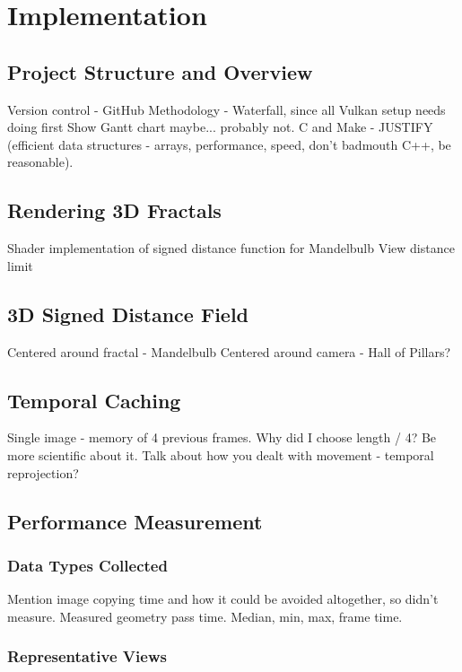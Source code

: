 \chapter{Implementation}
\label{chapter3}

\section{Project Structure and Overview}

Version control - GitHub
Methodology - Waterfall, since all Vulkan setup needs doing first
Show Gantt chart maybe... probably not.
C and Make - JUSTIFY (efficient data structures - arrays, performance, speed, don't badmouth C++, be reasonable).

\section{Rendering 3D Fractals}

Shader implementation of signed distance function for Mandelbulb
View distance limit

\section{3D Signed Distance Field}

Centered around fractal - Mandelbulb
Centered around camera - Hall of Pillars?

\section{Temporal Caching}

Single image - memory of 4 previous frames.
Why did I choose length / 4? Be more scientific about it.
Talk about how you dealt with movement - temporal reprojection?

\section{Performance Measurement}

\subsection{Data Types Collected}

Mention image copying time and how it could be avoided altogether, so didn't measure.
Measured geometry pass time.
Median, min, max, frame time.

\subsection{Representative Views}

